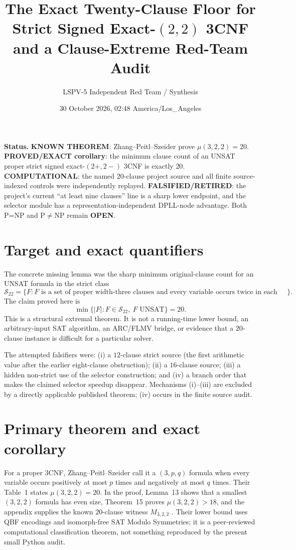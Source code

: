 \documentclass[10pt]{article}
\title{The Exact Twenty-Clause Floor for Strict Signed Exact-$(2,2)$ 3CNF\\
and a Clause-Extreme Red-Team Audit}
\author{LSPV-5 Independent Red Team / Synthesis}
\date{30 October 2026, 02:48 America/Los\_Angeles}
\begin{document}
\maketitle

\noindent\textbf{Status.} \textbf{KNOWN THEOREM}: Zhang--Peitl--Szeider prove
$\mu(3,2,2)=20$.  \textbf{PROVED/EXACT corollary}: the minimum clause count
of an UNSAT proper strict signed exact-$(2+,2-)$ 3CNF is exactly $20$.
\textbf{COMPUTATIONAL}: the named $20$-clause project source and all finite
source-indexed controls were independently replayed.  \textbf{FALSIFIED/RETIRED}:
the project's current ``at least nine clauses'' line is a sharp lower endpoint,
and the selector module has a representation-independent DPLL-node advantage.
Both P=NP and P$\ne$NP remain \textbf{OPEN}.

\section{Target and exact quantifiers}
The concrete missing lemma was the sharp minimum original-clause count for an
UNSAT formula in the strict class
\[
 \mathcal S_{22}=\{F: \text{$F$ is a set of proper width-three clauses and
 every variable occurs twice in each polarity}\}.
\]
The claim proved here is
\[
 \min\{|F|:F\in\mathcal S_{22},\ F\text{ UNSAT}\}=20. \tag{1}
\]
This is a structural extremal theorem.  It is not a running-time lower bound,
an arbitrary-input SAT algorithm, an ARC/FLMV bridge, or evidence that a
$20$-clause instance is difficult for a particular solver.

The attempted falsifiers were: (i) a $12$-clause strict source (the first
arithmetic value after the earlier eight-clause obstruction); (ii) a
$16$-clause source; (iii) a hidden non-strict use of the selector construction;
and (iv) a branch order that makes the claimed selector speedup disappear.
Mechanisms (i)--(iii) are excluded by a directly applicable published theorem;
(iv) occurs in the finite source audit.

\section{Primary theorem and exact corollary}
For a proper 3CNF, Zhang--Peitl--Szeider call it a $(3,p,q)$ formula when every
variable occurs positively at most $p$ times and negatively at most $q$ times.
Their Table~1 states $\mu(3,2,2)=20$.  In the proof, Lemma~13 shows that a
smallest $(3,2,2)$ formula has even size, Theorem~15 proves
$\mu(3,2,2)>18$, and the appendix supplies the known $20$-clause witness
$M_{3,2,2}$ \cite{ZPS}.  Their lower bound uses QBF encodings and
isomorph-free SAT Modulo Symmetries; it is a peer-reviewed computational
classification theorem, not something reproduced by the present small
Python audit.
\end{document}
